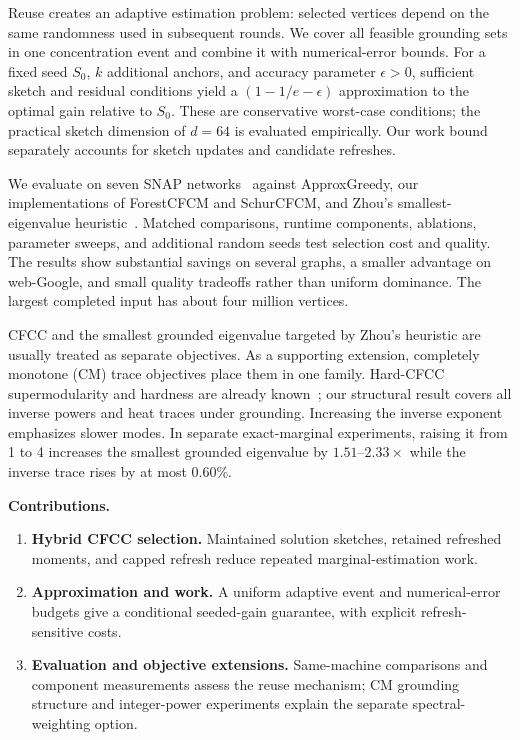 Reuse creates an adaptive estimation problem: selected vertices
depend on the same randomness used in subsequent rounds. We cover
all feasible grounding sets in one concentration event and combine it
with numerical-error bounds. For a fixed seed $S_0$, $k$ additional
anchors, and accuracy parameter $\epsilon>0$, sufficient sketch and
residual conditions yield a $(1-1/e-\epsilon)$ approximation to the
optimal gain relative to $S_0$. These are conservative worst-case
conditions; the practical sketch dimension of $d=64$ is evaluated
empirically. Our work bound separately accounts for sketch updates
and candidate refreshes.

We evaluate \alg{} on seven SNAP networks~\cite{snap2014} against
ApproxGreedy, our implementations of ForestCFCM and SchurCFCM, and
Zhou's smallest-eigenvalue heuristic~\cite{zhou2023}.
Matched comparisons, runtime components, ablations, parameter sweeps,
and additional random seeds test selection cost and quality.
The results show substantial savings on several graphs, a smaller
advantage on web-Google, and small quality tradeoffs rather than
uniform dominance. The largest completed input has about four million
vertices.

CFCC and the smallest grounded eigenvalue targeted by Zhou's
heuristic are usually treated as separate objectives. As a supporting
extension, completely monotone (CM) trace objectives place them in one
family. Hard-CFCC supermodularity and hardness are already
known~\cite{li2019}; our structural result covers all inverse powers
and heat traces under grounding. Increasing the inverse exponent
emphasizes slower modes. In separate exact-marginal experiments,
raising it from 1 to 4 increases the smallest grounded eigenvalue by
$1.51$--$2.33\times$ while the inverse trace rises by at most 0.60\%.

\smallskip\noindent\textbf{Contributions.}
\begin{enumerate}[leftmargin=*,itemsep=2pt,topsep=3pt]
\item \textbf{Hybrid CFCC selection.} Maintained solution sketches,
retained refreshed moments, and capped refresh reduce repeated
marginal-estimation work.
\item \textbf{Approximation and work.} A uniform adaptive event and
numerical-error budgets give a conditional seeded-gain guarantee,
with explicit refresh-sensitive costs.
\item \textbf{Evaluation and objective extensions.} Same-machine
comparisons and component measurements assess the reuse mechanism;
CM grounding structure and integer-power experiments explain the
separate spectral-weighting option.
\end{enumerate}


